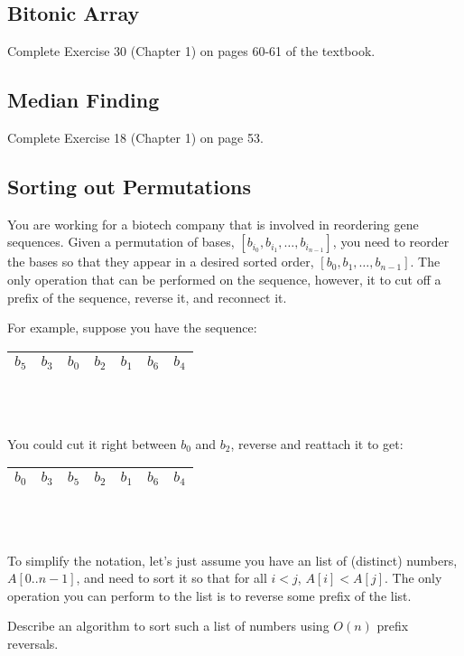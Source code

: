\documentclass[12pt]{article}
\begin{document}
\subsection{Bitonic Array}

Complete Exercise 30 (Chapter 1) on pages 60-61 of the textbook. 


\subsection{Median Finding}

Complete Exercise 18 (Chapter 1) on page 53.


\subsection{Sorting out Permutations}

You are working for a biotech company that is involved in reordering gene sequences. Given a permutation of bases, $[ b_{i_0}, b_{i_1}, \ldots, b_{i_{n-1}}]$, you need to reorder the bases so that they appear in a desired sorted order, $[b_0, b_1, \ldots, b_{n-1}]$. The only operation that can be performed on the sequence, however, it to cut off a prefix of the sequence, reverse it, and reconnect it.

For example, suppose you have the sequence:

\begin{tabular}{|*{7}{c|}}
    \hline
    $b_5$  & $b_3$  & $b_0$ & $b_2$ & $b_1$ & $b_6$ & $b_4$ \\
    \hline
  \end{tabular}\\~

You could cut it right between $b_0$ and $b_2$, reverse and reattach it to get:

\begin{tabular}{|*{7}{c|}}
    \hline
    $b_0$  & $b_3$  & $b_5$ & $b_2$ & $b_1$ & $b_6$ & $b_4$ \\
    \hline
  \end{tabular}\\~

\noindent To simplify the notation, let's just assume you have an list of (distinct) numbers, $A[0..n-1]$, and need to sort it so that for all $i < j$, $A[i] < A[j]$. The only operation you can perform to the list is to reverse some prefix of the list.

Describe an algorithm to sort such a list of numbers using $O(n)$ prefix reversals.
\end{document}
